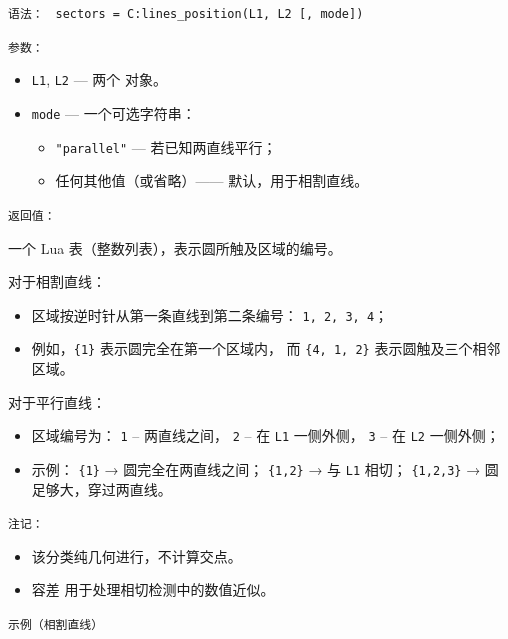 \texttt{语法： } \verb|sectors = C:lines_position(L1, L2 [, mode])|

\texttt{参数： }

\begin{itemize}
  \item \texttt{L1}, \texttt{L2} — 两个  对象。
  \item \texttt{mode} — 一个可选字符串：
    \begin{itemize}
      \item \texttt{"parallel"} — 若已知两直线平行；
      \item 任何其他值（或省略）—— 默认，用于相割直线。
    \end{itemize}
\end{itemize}

\texttt{返回值： }

一个 Lua 表（整数列表），表示圆所触及区域的编号。

\medskip
对于相割直线：
\begin{itemize}
  \item 区域按逆时针从第一条直线到第二条编号：
        \texttt{1, 2, 3, 4}；
  \item 例如，\texttt{\{1\}} 表示圆完全在第一个区域内，
        而 \texttt{\{4, 1, 2\}} 表示圆触及三个相邻区域。
\end{itemize}

对于平行直线：
\begin{itemize}
  \item 区域编号为：
        \texttt{1} – 两直线之间，
        \texttt{2} – 在 \texttt{L1} 一侧外侧，
        \texttt{3} – 在 \texttt{L2} 一侧外侧；
  \item 示例：
        \texttt{\{1\}} → 圆完全在两直线之间；
        \texttt{\{1,2\}} → 与 \texttt{L1} 相切；
        \texttt{\{1,2,3\}} → 圆足够大，穿过两直线。
\end{itemize}

\texttt{注记： }

\begin{itemize}
  \item 该分类纯几何进行，不计算交点。
  \item 容差  用于处理相切检测中的数值近似。
\end{itemize}

\texttt{示例（相割直线）}

\begin{tkzexample}[latex=.48\textwidth]
\end{tkzexample}

